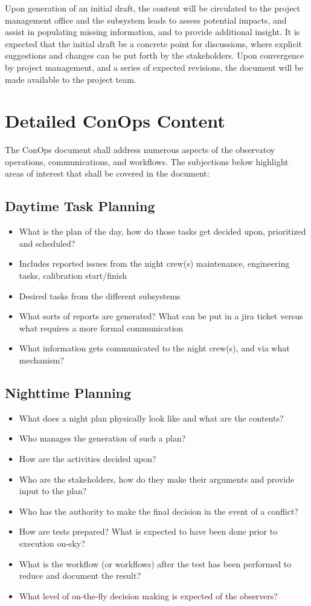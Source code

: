\documentclass[SE,authoryear,toc]{lsstdoc}
\begin{document}
Upon generation of an initial draft, the content will be circulated to the project management office and the subsystem leads to assess potential impacts, and assist in populating missing information, and to provide additional insight. 
It is expected that the initial draft be a concrete point for discussions, where explicit suggestions and changes can be put forth by the stakeholders.
Upon convergence by project management, and a series of expected revisions, the document will be made available to the project team. 

\section{Detailed ConOps Content}
The ConOps document shall address numerous aspects of the observatoy operations, communications, and workflows.
The subjections below highlight areas of interest that shall be covered in the document:

\subsection{Daytime Task Planning}

\begin{itemize}
\item What is the plan of the day, how do those tasks get decided upon, prioritized and scheduled?
\item Includes reported issues from the night crew(s) maintenance, engineering tasks, calibration start/finish
\item Desired tasks from the different subsystems
\item What sorts of reports are generated? What can be put in a jira ticket versus what requires a more formal communication
\item What information gets communicated to the night crew(s), and via what mechanism?
\end{itemize}

\subsection{Nighttime Planning}
\begin{itemize}
\item What does a night plan physically look like and what are the contents?
\item Who manages the generation of such a plan?
\item How are the activities decided upon?
\item Who are the stakeholders, how do they make their arguments and provide input to the plan?
\item Who has the authority to make the final decision in the event of a conflict?
\item How are tests prepared? What is expected to have been done prior to execution on-sky?
\item What is the workflow (or workflows) after the test has been performed to reduce and document the result?
\item What level of on-the-fly decision making is expected of the observers?
\end{itemize}
\end{document}
